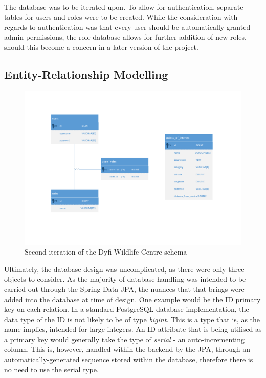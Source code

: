 The database was to be iterated upon. To allow for authentication, separate tables for users and roles were to be created. While the consideration with regards to authentication was that every user should be automatically granted admin permissions, the role database allows for further addition of new roles, should this become a concern in a later version of the project.

\subsection{Entity-Relationship Modelling}
\begin{figure}[!ht]
	\caption{Second iteration of the Dyfi Wildlife Centre schema}
	\includegraphics[scale=0.5]{diagrams/er_diagram}
\end{figure}	

Ultimately, the database design was uncomplicated, as there were only three objects to consider. As the majority of database handling was intended to be carried out through the Spring Data JPA, the nuances that that brings were added into the database at time of design. One example would be the ID primary key on each relation. In a standard PostgreSQL database implementation, the data type of the ID is not likely to be of type \textit{bigint}. This is a type that is, as the name implies, intended for large integers. An ID attribute that is being utilised as a primary key would generally take the type of \textit{serial} - an auto-incrementing column. This is, however, handled within the backend by the JPA, through an automatically-generated sequence stored within the database, therefore there is no need to use the serial type.


